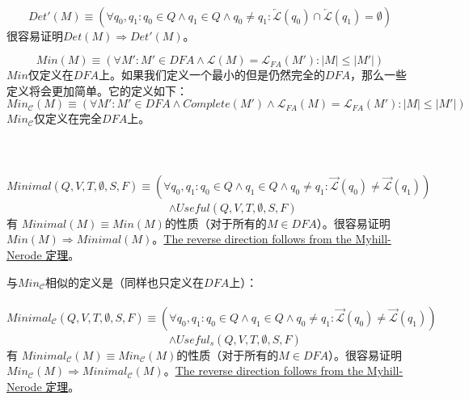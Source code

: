 {{{{ \\

$$ Det'(M) \equiv (\forall q_0,q_1 : q_0 \in Q \land q_1 \in Q \land q_0 \not= q_1 : \overleftarrow{\mathcal{L}}(q_0) \cap \overleftarrow{\mathcal{L}}(q_1) = \emptyset ) $$
很容易证明$Det(M) \Rightarrow Det'(M)$。
\newline

$$ Min(M) \equiv (\forall M' : M' \in DFA \land \mathcal{L}(M) = \mathcal{L}_{FA}(M') : |M| \leq |M'| ) $$
$Min$仅定义在$DFA$上。如果我们定义一个最小的但是仍然完全的$DFA$，那么一些定义将会更加简单。它的定义如下：
$$ Min_{\mathcal{C}}(M) \equiv ( \forall M':M' \in DFA \land Complete(M') \land \mathcal{L}_{FA}(M) = \mathcal{L}_{FA}(M'): |M| \leq |M'| ) $$
$Min_{\mathcal{C}}$仅定义在完全$DFA$上。 \\

 \\

 \\
\mbox{　　}$Minimal(Q,V,T,\emptyset,S,F) \equiv  ( \forall q_0,q_1:q_0 \in Q \land q_1 \in Q \land q_0 \not= q_1 : \overrightarrow{\mathcal{L}}(q_0) \not= \overrightarrow{\mathcal{L}}(q_1)  )$ \\
\mbox{　　　　　　　　　　　　　　} $\land Useful(Q,V,T,\emptyset,S,F)$ \\
有 $Minimal(M) \equiv Min(M)$的性质（对于所有的$M\in DFA$）。很容易证明$Min(M) \Rightarrow Minimal(M)$。\uline{The reverse direction follows from the Myhill-Nerode 定理}。

与$Min_{\mathcal{C}}$相似的定义是（同样也只定义在$DFA$上）：\\
\mbox{　　}$Minimal_{\mathcal{C}}(Q,V,T,\emptyset,S,F) \equiv  ( \forall q_0,q_1:q_0 \in Q \land q_1 \in Q \land q_0 \not= q_1 : \overrightarrow{\mathcal{L}}(q_0) \not= \overrightarrow{\mathcal{L}}(q_1)  )$ \\
\mbox{　　　　　　　　　　　　　　} $\land Useful_s (Q,V,T,\emptyset,S,F)$ \\
有 $Minimal_{\mathcal{C}}(M) \equiv Min_{\mathcal{C}}(M)$的性质（对于所有的$M\in DFA$）。很容易证明$Min_{\mathcal{C}}(M) \Rightarrow Minimal_{\mathcal{C}}(M)$。\uline{The reverse direction follows from the Myhill-Nerode 定理}。

}}}}
